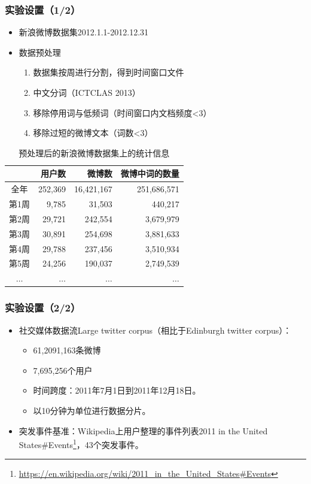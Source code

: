 \begin{frame}
\frametitle{实验设置（1/2）}
\begin{itemize}
	\item 新浪微博数据集2012.1.1-2012.12.31
	\item 数据预处理
	\begin{enumerate}
		\item 数据集按周进行分割，得到时间窗口文件
		\item 中文分词（ICTCLAS 2013）
		\item 移除停用词与低频词（时间窗口内文档频度<3）
		\item 移除过短的微博文本（词数<3）
	\end{enumerate}
\end{itemize}

\begin{table}
\setlength{\abovecaptionskip}{0.cm}
\setlength{\belowcaptionskip}{0.cm}
\scriptsize
\centering
\caption{预处理后的新浪微博数据集上的统计信息}
\begin{tabular}{|c|r|r|r|} \hline
 & 用户数 & 微博数 & 微博中词的数量 \\ \hline
全年& 252,369 & 16,421,167 & 251,686,571\\ \hline
第1周 & 9,785 & 31,503 & 440,217 \\ \hline
第2周 & 29,721 & 242,554 & 3,679,979 \\ \hline
第3周 & 30,891 & 254,698 & 3,881,633 \\ \hline
第4周 & 29,788 & 237,456 & 3,510,934 \\ \hline
第5周 & 24,256 & 190,037 & 2,749,539 \\ \hline
\(\dots\) & \(\dots\) & \(\dots\) & \(\dots\) \\ \hline
\end{tabular}
\label{statisticsOfDataset}
\end{table}
\end{frame}

\begin{frame}
\frametitle{实验设置（2/2）}

\begin{itemize}
	\item 社交媒体数据流Large twitter corpus（相比于Edinburgh twitter corpus）：
	\begin{itemize}
		\item 61,2091,163条微博
		\item 7,695,256个用户
		\item 时间跨度：2011年7月1日到2011年12月18日。
		\item 以10分钟为单位进行数据分片。
	\end{itemize}
	\item 突发事件基准：Wikipedia上用户整理的事件列表2011 in the United States\#Events\footnote{\url{https://en.wikipedia.org/wiki/2011_in_the_United_States\#Events}}，43个突发事件。
\end{itemize} 
\end{frame}

